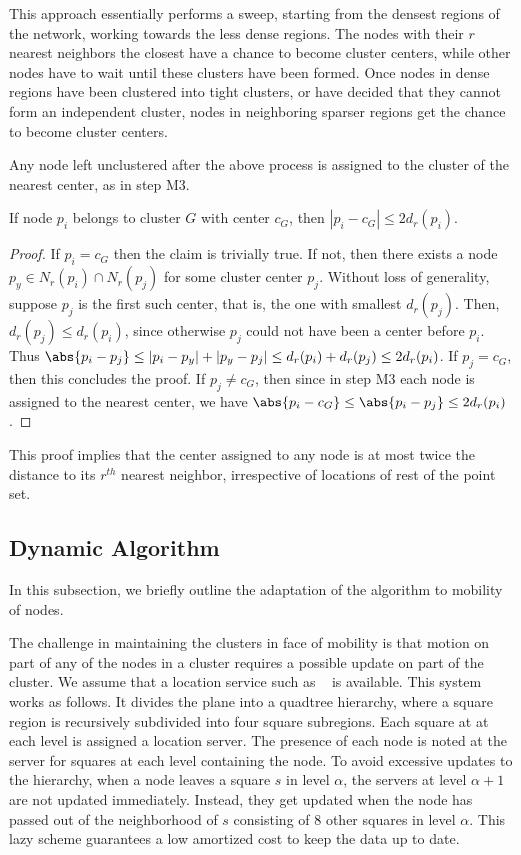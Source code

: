 This approach essentially performs a sweep, starting from the densest regions of the network, working towards the less dense regions. The nodes with their $r$ nearest neighbors the closest have a chance to become cluster centers, while other nodes have to wait until these clusters have been formed. Once nodes in dense regions have been clustered into tight clusters, or have decided that they cannot form an independent cluster, nodes in neighboring sparser regions get the chance to become cluster centers. 

Any node left unclustered after the above process is assigned to the cluster of the nearest center, as in step M3. 

\begin{theorem}
If node $p_i$ belongs to cluster $G$ with center $c_G$, then $|p_{i} - c_G|\leq 2 d_{r}(p_{i})$. 
\end{theorem}
\begin{proof}
If $p_i=c_G$ then the claim is trivially true. If not, then there exists a node $p_y \in N_{r}(p_i)\cap N_{r}(p_j)$ for some cluster center $p_j$. Without loss of generality, suppose $p_j$ is the first such center, that is, the one with smallest $d_{r}(p_j)$. Then, $d_{r}(p_j)\leq d_{r}(p_i)$, since otherwise $p_j$ could not have been a center before $p_i$. Thus $\abs{p_{i}-p_{j}}\leq |p_i-p_y|+|p_y-p_j|\leq d_r(p_i)+d_r(p_j)\leq 2 d_{r}(p_i)$.
If $p_j=c_G$, then this concludes the proof. If $p_j\neq c_G$, then since in step M3 each node is assigned to the nearest center, we have $\abs{p_{i}-c_G}\leq \abs{p_{i}-p_{j}}\leq 2 d_{r}(p_i)$.
\end{proof}

This proof implies that the center assigned to any node is at most twice the distance to its $r^{th}$ nearest neighbor, irrespective of locations of rest of the point set. 

\subsection{Dynamic Algorithm}\label{subsec:dynamic}

In this subsection, we briefly outline the adaptation of the algorithm to mobility of nodes.

 The challenge in maintaining the clusters in face of mobility is that motion on part of any of the nodes in a cluster requires a possible update on part of the cluster. We assume that a location service such as ~\cite{abraham04LLS} is available. This system works as follows. It divides the plane into a quadtree hierarchy, where a square region is recursively subdivided into four square subregions. Each square at at each level is assigned a location server. The presence of each node is noted at the server for squares at each level containing the node. To avoid excessive updates to the hierarchy, when a node leaves a square $s$ in level $\alpha$, the servers at level $\alpha+1$ are not updated immediately. Instead, they get updated when the node has passed out of the neighborhood of $s$ consisting of $8$ other squares in level $\alpha$. This lazy scheme guarantees a low amortized cost to keep the data up to date. 

